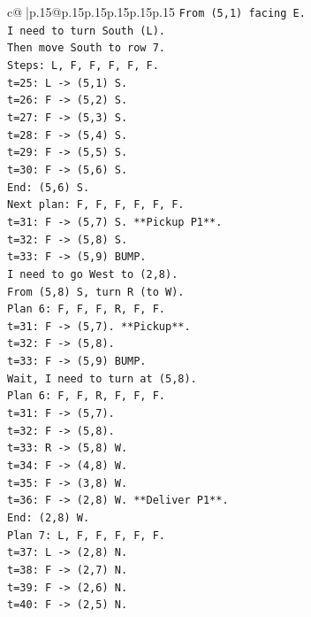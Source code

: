 \documentclass{article}
\begin{document}
{\begin{supertabular}{c@{$\;$}|p{.15\linewidth}@{}p{.15\linewidth}p{.15\linewidth}p{.15\linewidth}p{.15\linewidth}p{.15\linewidth}}
{{{\texttt{From (5,1) facing E.} \\
\texttt{I need to turn South (L).} \\
\texttt{Then move South to row 7.} \\
\texttt{Steps: L, F, F, F, F, F.} \\
\texttt{t=25: L {-}> (5,1) S.} \\
\texttt{t=26: F {-}> (5,2) S.} \\
\texttt{t=27: F {-}> (5,3) S.} \\
\texttt{t=28: F {-}> (5,4) S.} \\
\texttt{t=29: F {-}> (5,5) S.} \\
\texttt{t=30: F {-}> (5,6) S.} \\
\texttt{End: (5,6) S.} \\
\texttt{Next plan: F, F, F, F, F, F.} \\
\texttt{t=31: F {-}> (5,7) S. **Pickup P1**.} \\
\texttt{t=32: F {-}> (5,8) S.} \\
\texttt{t=33: F {-}> (5,9) BUMP.} \\
\texttt{I need to go West to (2,8).} \\
\texttt{From (5,8) S, turn R (to W).} \\
\texttt{Plan 6: F, F, F, R, F, F.} \\
\texttt{t=31: F {-}> (5,7). **Pickup**.} \\
\texttt{t=32: F {-}> (5,8).} \\
\texttt{t=33: F {-}> (5,9) BUMP.} \\
\texttt{Wait, I need to turn at (5,8).} \\
\texttt{Plan 6: F, F, R, F, F, F.} \\
\texttt{t=31: F {-}> (5,7).} \\
\texttt{t=32: F {-}> (5,8).} \\
\texttt{t=33: R {-}> (5,8) W.} \\
\texttt{t=34: F {-}> (4,8) W.} \\
\texttt{t=35: F {-}> (3,8) W.} \\
\texttt{t=36: F {-}> (2,8) W. **Deliver P1**.} \\
\texttt{End: (2,8) W.} \\
\texttt{Plan 7: L, F, F, F, F, F.} \\
\texttt{t=37: L {-}> (2,8) N.} \\
\texttt{t=38: F {-}> (2,7) N.} \\
\texttt{t=39: F {-}> (2,6) N.} \\
\texttt{t=40: F {-}> (2,5) N.} \\
}}}
\end{supertabular}}
\end{document}
